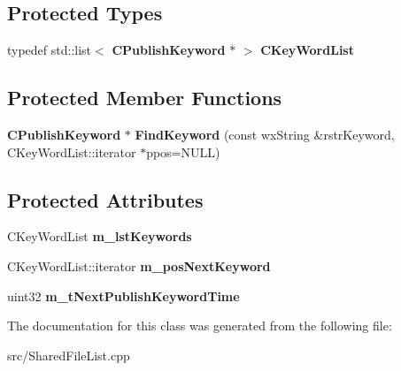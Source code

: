 \subsection*{Protected Types}
\begin{DoxyCompactItemize}
\item 
typedef std::list$<$ {\bf CPublishKeyword} $\ast$ $>$ {\bfseries CKeyWordList}\label{classCPublishKeywordList_af0aaa8fad29ac55f685336d9cc9e0150}

\end{DoxyCompactItemize}
\subsection*{Protected Member Functions}
\begin{DoxyCompactItemize}
\item 
{\bf CPublishKeyword} $\ast$ {\bfseries FindKeyword} (const wxString \&rstrKeyword, CKeyWordList::iterator $\ast$ppos=NULL)\label{classCPublishKeywordList_a344e75e11d9a15338b0721ec80b09e10}

\end{DoxyCompactItemize}
\subsection*{Protected Attributes}
\begin{DoxyCompactItemize}
\item 
CKeyWordList {\bfseries m\_\-lstKeywords}\label{classCPublishKeywordList_afe84a4feb6b6a0f7abcefe7c30dfedb6}

\item 
CKeyWordList::iterator {\bfseries m\_\-posNextKeyword}\label{classCPublishKeywordList_a0c1bc5c4e837f00e30f61c4fb6297596}

\item 
uint32 {\bfseries m\_\-tNextPublishKeywordTime}\label{classCPublishKeywordList_acd4ae6dd1ab13341f1deae2289814c35}

\end{DoxyCompactItemize}


The documentation for this class was generated from the following file:\begin{DoxyCompactItemize}
\item 
src/SharedFileList.cpp\end{DoxyCompactItemize}
